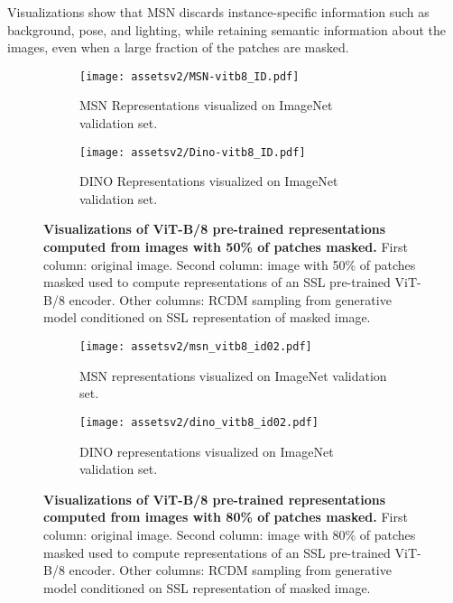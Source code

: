 \documentclass{article}
\begin{document}
Visualizations show that MSN  discards instance-specific information such as background, pose, and lighting, while retaining semantic information about the images, even when a large fraction of the patches are masked.

\begin{figure}[t]
    \begin{subfigure}{\linewidth}
        \centering
        \texttt{[image: assetsv2/MSN-vitb8\_ID.pdf]}
        \caption{MSN Representations visualized on ImageNet validation set.}
        \label{fig:qualitative_msn}
    \end{subfigure}\vspace{1ex}
    \begin{subfigure}{\linewidth}
        \centering
        \texttt{[image: assetsv2/Dino-vitb8\_ID.pdf]}
        \caption{DINO Representations visualized on ImageNet validation set.}
        \label{fig:qualitative_dino}
    \end{subfigure}
    \caption{{\bf Visualizations of ViT-B/8 pre-trained representations computed from images with 50\% of patches masked.} First column: original image. Second column: image with 50\% of patches masked used to compute representations of an SSL pre-trained ViT-B/8 encoder. Other columns: RCDM sampling from generative model conditioned on SSL representation of masked image.}
    \label{fig:qualitiative_50percent}
\end{figure}
\begin{figure}[t]
    \begin{subfigure}{\linewidth}
        \centering
        \texttt{[image: assetsv2/msn\_vitb8\_id02.pdf]}
        \caption{MSN representations visualized on ImageNet validation set.}
        \label{fig:qualitative_msn_high_mask}
    \end{subfigure}\vspace{1ex}
    \begin{subfigure}{\linewidth}
        \centering
        \texttt{[image: assetsv2/dino\_vitb8\_id02.pdf]}
        \caption{DINO representations visualized on ImageNet validation set.}
        \label{fig:qualitative_dino_high_mask}
    \end{subfigure}
    \caption{{\bf Visualizations of ViT-B/8 pre-trained representations computed from images with 80\% of patches masked.} First column: original image. Second column: image with 80\% of patches masked used to compute representations of an SSL pre-trained ViT-B/8 encoder. Other columns: RCDM sampling from generative model conditioned on SSL representation of masked image.}
    \label{fig:qualitiative_80percent}
\end{figure}
\end{document}
